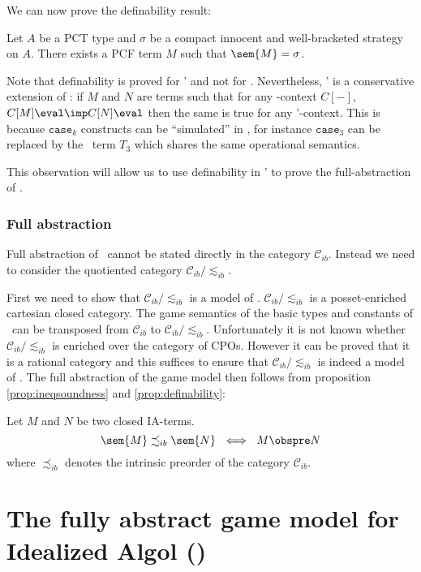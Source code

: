 We can now prove the definability result:
\begin{proposition}[Definability]
\label{prop:definability} Let $A$ be a PCT type and $\sigma$ be a compact innocent and well-bracketed
strategy on $A$. There exists a PCF term $M$ such that $\sem{M} = \sigma$.
\end{proposition}

Note that definability is proved for \pcf' and not for \pcf.
Nevertheless, \pcf' is a conservative extension of \pcf: if $M$ and
$N$ are terms such that for any \pcf-context $C[-]$, $C[M] \eval
\imp C[N] \eval$ then the same is true for any \pcf'-context. This
is because $\texttt{case}_k$ constructs can be ``simulated'' in
\pcf, for instance $\texttt{case}_3$ can be replaced by the \pcf\
term $T_3$ which shares the same operational semantics.

This observation will allow us to use definability in \pcf' to
prove the full-abstraction of \pcf.


\subsubsection{Full abstraction}

Full abstraction of \pcf\ cannot be stated directly in the category $\mathcal{C}_{ib}$. Instead we need to consider the quotiented category
$\mathcal{C}_{ib}/\lesssim_{ib}$.

First we need to show that $\mathcal{C}_{ib}/\lesssim_{ib}$ is a
model of \pcf. $\mathcal{C}_{ib}/\lesssim_{ib}$ is a posset-enriched
cartesian closed category. The game semantics of the basic types and
constants of \pcf\ can be transposed from $\mathcal{C}_{ib}$ to
$\mathcal{C}_{ib}/\lesssim_{ib}$. Unfortunately it is not known
whether $\mathcal{C}_{ib}/\lesssim_{ib}$ is enriched over the
category of CPOs. However it can be proved that it is a rational
category \citep{abramsky94full} and this suffices to ensure that
$\mathcal{C}_{ib}/\lesssim_{ib}$ is indeed a model of \pcf. The full
abstraction of the game model then follows from proposition
\ref{prop:ineqsoundness} and \ref{prop:definability}:
\begin{theorem}
Let $M$ and $N$ be two closed IA-terms.
$$\sem{M} \precsim_{ib} \sem{N} \ \iff \ M \obspre N$$
where $\precsim_{ib}$ denotes the intrinsic preorder of the category $\mathcal{C}_{ib}$.
\end{theorem}

\section{The fully abstract game model for Idealized Algol (\ialgol)}

